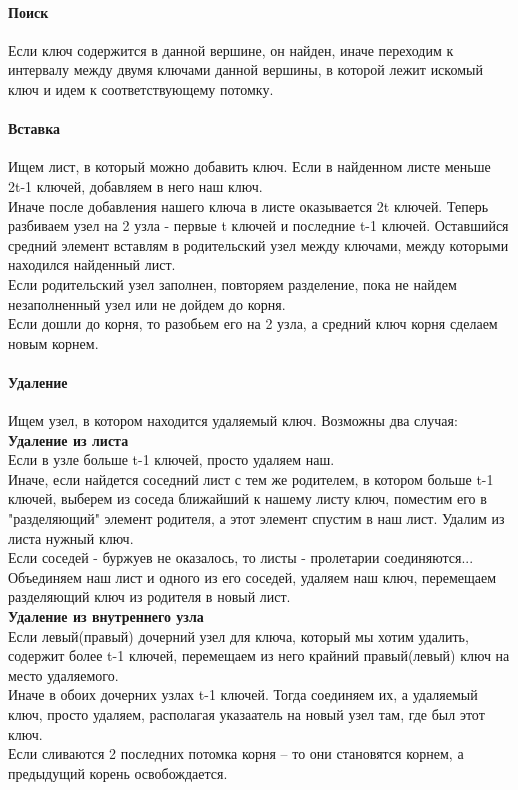 \documentclass[a4paper,10pt]{article}
\begin{document}
\paragraph{Поиск} Если ключ содержится в данной вершине, он найден, иначе переходим к интервалу между двумя ключами данной вершины, в которой лежит искомый ключ и идем к соответствующему потомку.
\paragraph{Вставка}
Ищем лист, в который можно добавить ключ. Если в найденном листе меньше 2t-1 ключей, добавляем в него наш ключ.\\
Иначе после добавления нашего ключа в листе оказывается 2t ключей. Теперь разбиваем узел на 2 узла - первые t ключей и последние t-1 ключей. Оставшийся средний элемент вставлям в родительский узел между ключами, между которыми находился найденный лист.\\
Если родительский узел заполнен, повторяем разделение, пока не найдем незаполненный узел или не дойдем до корня.\\
Если дошли до корня, то разобьем его на 2 узла, а средний ключ корня сделаем новым корнем.\\
\paragraph{Удаление}
Ищем узел, в котором находится удаляемый ключ. Возможны два случая:\\
\textbf{Удаление из листа}\\
Если в узле больше t-1 ключей, просто удаляем наш.\\
Иначе, если найдется соседний лист с тем же родителем, в котором больше t-1 ключей, выберем из соседа ближайший к нашему листу ключ, поместим его в "разделяющий" элемент родителя, а этот элемент спустим в наш лист. Удалим из листа нужный ключ.\\
Если соседей - буржуев не оказалось, то листы - пролетарии соединяются...  Объединяем наш лист и одного из его соседей, удаляем наш ключ, перемещаем разделяющий ключ из родителя в новый лист.\\
\textbf{Удаление из внутреннего узла}\\
Если левый(правый) дочерний узел для ключа, который мы хотим удалить, содержит более t-1 ключей, перемещаем из него крайний правый(левый) ключ на место удаляемого.\\
Иначе в обоих дочерних узлах t-1 ключей. Тогда соединяем их, а удаляемый ключ, просто удаляем, располагая указаатель на новый узел там, где был этот ключ.\\
Если сливаются 2 последних потомка корня – то они становятся корнем, а предыдущий корень освобождается.\\ 
\end{document}
